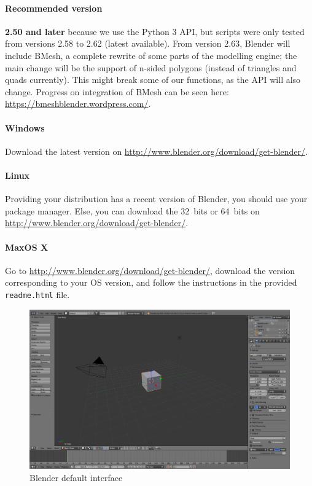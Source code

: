 \documentclass{article}
\begin{document}
	\paragraph{Recommended version} \textbf{2.50 and later} because we use the Python 3 API, but scripts were only tested from versions 2.58 to 2.62 (latest available). From version 2.63, Blender will include BMesh, a complete rewrite of some parts of the modelling engine; the main change will be the support of n-sided polygons (instead of triangles and quads currently). This might break some of our functions, as the API will also change. Progress on integration of BMesh can be seen here: \url{https://bmeshblender.wordpress.com/}.

	\paragraph{Windows} Download the latest version on \url{http://www.blender.org/download/get-blender/}.

	\paragraph{Linux} Providing your distribution has a recent version of Blender, you should use your package manager. Else, you can download the 32~bits or 64~bits on \url{http://www.blender.org/download/get-blender/}.

	\paragraph{MaxOS X} Go to \url{http://www.blender.org/download/get-blender/}, download the version corresponding to your OS version, and follow the instructions in the provided \texttt{readme.html} file.

	\begin{figure}[h!]
		\centering
		\includegraphics[width=\linewidth]{blender.png}
		\caption{Blender default interface}
	\end{figure}
\end{document}
